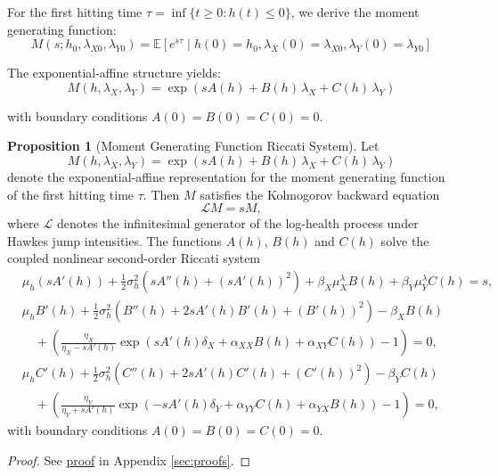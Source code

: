 \documentclass{article}
\theoremstyle{definition}
\newtheorem{proposition}{Proposition}[section]
\newcommand{\proofref}[1]{\hyperlink{#1}{proof}}
\begin{document}
For the first hitting time $\tau = \inf\{t \geq 0 : h(t) \leq 0\}$, we derive the moment generating function:
\begin{equation}
M(s; h_0, \lambda_{X0}, \lambda_{Y0}) = \mathbb{E}[e^{s\tau} \mid h(0) = h_0, \lambda_X(0) = \lambda_{X0}, \lambda_Y(0) = \lambda_{Y0}]
\end{equation}

The exponential-affine structure yields:
\begin{equation}
M(h, \lambda_X, \lambda_Y) = \exp\!\left( s A(h) + B(h)\,\lambda_X + C(h)\,\lambda_Y \right) \label{eq:mgf_ansatz}
\end{equation}

with boundary conditions $A(0) = B(0) = C(0) = 0$.

\begin{proposition}[Moment Generating Function Riccati System]
\label{prop:mgf_riccati}
Let 
\[
M(h, \lambda_X, \lambda_Y) 
= \exp\!\left( s A(h) + B(h)\,\lambda_X + C(h)\,\lambda_Y \right)
\]
denote the exponential-affine representation for the moment generating function of the first hitting time $\tau$. Then $M$ satisfies the Kolmogorov backward equation
\[
\mathcal{L}M = s M,
\]
where $\mathcal{L}$ denotes the infinitesimal generator of the log-health process under Hawkes jump intensities. The functions $A(h)$, $B(h)$ and $C(h)$ solve the coupled nonlinear second-order Riccati system
\[
\begin{aligned}
& \mu_h (s A'(h)) 
+ \frac{1}{2}\sigma_h^2 \left( s A''(h) + (s A'(h))^2 \right)
+ \beta_X \mu_X^\lambda B(h) 
+ \beta_Y \mu_Y^\lambda C(h) 
= s, \\[1.2ex]
& \mu_h B'(h) 
+ \frac{1}{2}\sigma_h^2 \left( B''(h) + 2 s A'(h) B'(h) + (B'(h))^2 \right)
- \beta_X B(h) \\
&\quad + \left( \frac{\eta_X}{\eta_X - s A'(h)} 
\exp\!\left( s A'(h)\delta_X + \alpha_{XX} B(h) + \alpha_{XY} C(h) \right) - 1 \right) 
= 0, \\[1.2ex]
& \mu_h C'(h) 
+ \frac{1}{2}\sigma_h^2 \left( C''(h) + 2 s A'(h) C'(h) + (C'(h))^2 \right)
- \beta_Y C(h) \\
&\quad + \left( \frac{\eta_Y}{\eta_Y + s A'(h)} 
\exp\!\left( -s A'(h)\delta_Y + \alpha_{YY} C(h) + \alpha_{YX} B(h) \right) - 1 \right) 
= 0,
\end{aligned}
\]
with boundary conditions $A(0) = B(0) = C(0) = 0$.
\end{proposition}

\begin{proof}
See \proofref{prop:mgf_riccati} in Appendix \ref{sec:proofs}.
\end{proof}
\end{document}
